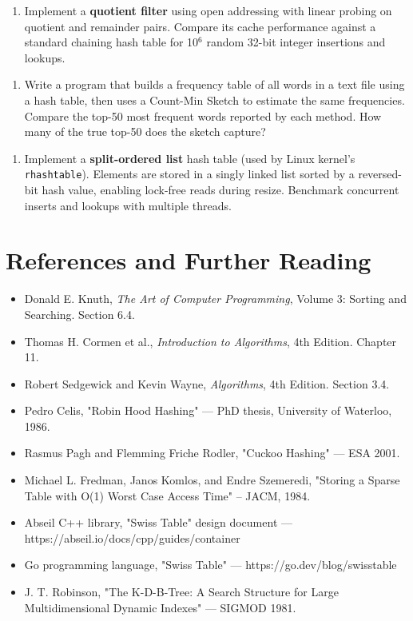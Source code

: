 \begin{enumerate}
\item Implement a \textbf{quotient filter} using open addressing with linear probing on quotient and remainder pairs. Compare its cache performance against a standard chaining hash table for 10$^{6}$ random 32-bit integer insertions and lookups.
\end{enumerate}

\begin{enumerate}
\item Write a program that builds a frequency table of all words in a text file using a hash table, then uses a Count-Min Sketch to estimate the same frequencies. Compare the top-50 most frequent words reported by each method. How many of the true top-50 does the sketch capture?
\end{enumerate}

\begin{enumerate}
\item Implement a \textbf{split-ordered list} hash table (used by Linux kernel's \texttt{rhashtable}). Elements are stored in a singly linked list sorted by a reversed-bit hash value, enabling lock-free reads during resize. Benchmark concurrent inserts and lookups with multiple threads.
\end{enumerate}

\section{References and Further Reading}

\begin{itemize}
\item Donald E. Knuth, \textit{The Art of Computer Programming}, Volume 3: Sorting and Searching. Section 6.4.
\item Thomas H. Cormen et al., \textit{Introduction to Algorithms}, 4th Edition. Chapter 11.
\item Robert Sedgewick and Kevin Wayne, \textit{Algorithms}, 4th Edition. Section 3.4.
\item Pedro Celis, "Robin Hood Hashing" — PhD thesis, University of Waterloo, 1986.
\item Rasmus Pagh and Flemming Friche Rodler, "Cuckoo Hashing" — ESA 2001.
\item Michael L. Fredman, Janos Komlos, and Endre Szemeredi, "Storing a Sparse Table with O(1) Worst Case Access Time" -- JACM, 1984.
\item Abseil C++ library, "Swiss Table" design document — https://abseil.io/docs/cpp/guides/container
\item Go programming language, "Swiss Table" — https://go.dev/blog/swisstable
\item J. T. Robinson, "The K-D-B-Tree: A Search Structure for Large Multidimensional Dynamic Indexes" — SIGMOD 1981.
\end{itemize}

